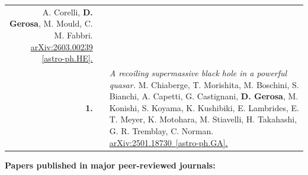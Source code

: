 {\begin{longtable}{rp{0.3cm}p{15.8cm}}
A. Corelli, \textbf{D. Gerosa}, M. Mould, C. M. Fabbri.
\newline{}
\href{https://arxiv.org/abs/2603.00239}{arXiv:2603.00239 [astro-ph.HE].}
\vspace{0.09cm}\\
%
\textbf{1.} & & \textit{A recoiling supermassive black hole in a powerful quasar.}
\newline{}
M. Chiaberge, T. Morishita, M. Boschini, S. Bianchi, A. Capetti, G. Castignani, \textbf{D. Gerosa}, M. Konishi, S. Koyama, K. Kushibiki, E. Lambrides, E. T. Meyer, K. Motohara, M. Stiavelli, H. Takahashi, G. R. Tremblay, C. Norman.
\newline{}
\href{https://arxiv.org/abs/2501.18730}{arXiv:2501.18730 [astro-ph.GA].}
\vspace{0.09cm}\\
%
\end{longtable} }
\textcolor{color1}{\textbf{Papers published in major peer-reviewed journals:}}
\vspace{-0.5cm}

